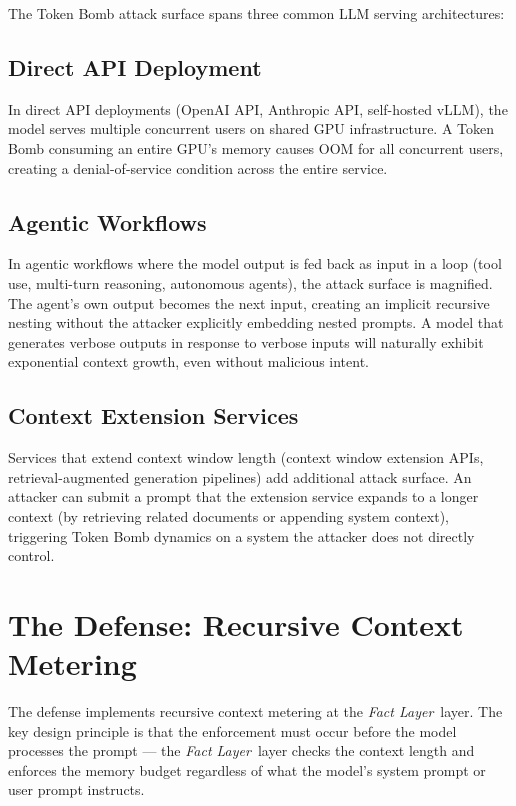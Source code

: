 \documentclass[12pt]{article}
\newcommand{\fact}{\textit{Fact Layer}}
\begin{document}
The Token Bomb attack surface spans three common LLM serving architectures:

\subsection{Direct API Deployment}
In direct API deployments (OpenAI API, Anthropic API, self-hosted vLLM), the model serves multiple concurrent users on shared GPU infrastructure. A Token Bomb consuming an entire GPU's memory causes OOM for all concurrent users, creating a denial-of-service condition across the entire service.

\subsection{Agentic Workflows}
In agentic workflows where the model output is fed back as input in a loop (tool use, multi-turn reasoning, autonomous agents), the attack surface is magnified. The agent's own output becomes the next input, creating an implicit recursive nesting without the attacker explicitly embedding nested prompts. A model that generates verbose outputs in response to verbose inputs will naturally exhibit exponential context growth, even without malicious intent.

\subsection{Context Extension Services}
Services that extend context window length (context window extension APIs, retrieval-augmented generation pipelines) add additional attack surface. An attacker can submit a prompt that the extension service expands to a longer context (by retrieving related documents or appending system context), triggering Token Bomb dynamics on a system the attacker does not directly control.

\section{The Defense: Recursive Context Metering}
\label{sec:defense}

The defense implements recursive context metering at the \fact\ layer. The key design principle is that the enforcement must occur before the model processes the prompt — the \fact\ layer checks the context length and enforces the memory budget regardless of what the model's system prompt or user prompt instructs.
\end{document}
